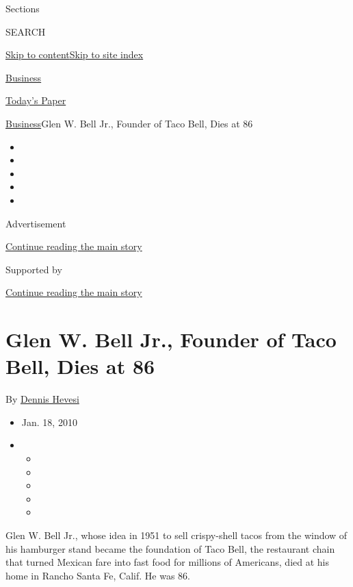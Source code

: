 Sections

SEARCH

\protect\hyperlink{site-content}{Skip to
content}\protect\hyperlink{site-index}{Skip to site index}

\href{https://www.nytimes.com/section/business}{Business}

\href{https://myaccount.nytimes.com/auth/login?response_type=cookie\&client_id=vi}{}

\href{https://www.nytimes.com/section/todayspaper}{Today's Paper}

\href{/section/business}{Business}\textbar{}Glen W. Bell Jr., Founder of
Taco Bell, Dies at 86

\begin{itemize}
\item
\item
\item
\item
\item
\end{itemize}

Advertisement

\protect\hyperlink{after-top}{Continue reading the main story}

Supported by

\protect\hyperlink{after-sponsor}{Continue reading the main story}

\hypertarget{glen-w-bell-jr-founder-of-taco-bell-dies-at-86}{%
\section{Glen W. Bell Jr., Founder of Taco Bell, Dies at
86}\label{glen-w-bell-jr-founder-of-taco-bell-dies-at-86}}

By \href{https://www.nytimes.com/by/dennis-hevesi}{Dennis Hevesi}

\begin{itemize}
\item
  Jan. 18, 2010
\item
  \begin{itemize}
  \item
  \item
  \item
  \item
  \item
  \end{itemize}
\end{itemize}

Glen W. Bell Jr., whose idea in 1951 to sell crispy-shell tacos from the
window of his hamburger stand became the foundation of Taco Bell, the
restaurant chain that turned Mexican fare into fast food for millions of
Americans, died at his home in Rancho Santa Fe, Calif. He was 86.

